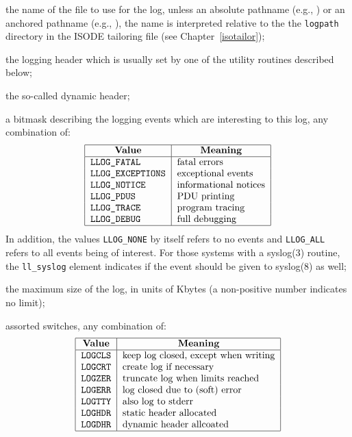 \begin{describe}
\item[\verb"ll\_file":] the name of the file to use for the log,
unless an absolute pathname (e.g., )
or an anchored pathname (e.g., ),
the name is interpreted relative to the the \verb"logpath" directory
in the ISODE tailoring file (see Chapter~\ref{isotailor});

\item[\verb"ll\_hdr":] the logging header which
is usually set by one of the utility routines described below;

\item[\verb"ll\_hdr"/\verb"ll\_dhdr":] the so-called dynamic header;

\item[\verb"ll\_events"/\verb"ll\_syslog":] a bitmask describing the logging
events which are interesting to this log, any combination of:
\[\begin{tabular}{|l|l|}
\hline
    \multicolumn{1}{|c|}{\bf Value}&
		\multicolumn{1}{c|}{\bf Meaning}\\
\hline
    \tt LLOG\_FATAL&		fatal errors\\
    \tt LLOG\_EXCEPTIONS&	exceptional events\\
    \tt LLOG\_NOTICE&		informational notices\\
    \tt LLOG\_PDUS&		PDU printing\\
    \tt LLOG\_TRACE&		program tracing\\
    \tt LLOG\_DEBUG&		full debugging\\
\hline
\end{tabular}\]
In addition, the values \verb"LLOG_NONE" by itself refers to no events
and \verb"LLOG_ALL" refers to all events being of interest.
For those systems with a \man syslog(3) routine,
the \verb"ll_syslog" element indicates if the event should be given to 
\man syslog(8) as well;

\item[\verb"ll\_msize":] the maximum size of the log, in units of Kbytes
(a non-positive number indicates no limit);

\item[\verb"ll\_stat":] assorted switches, any combination of:
\[\begin{tabular}{|l|l|}
\hline
    \multicolumn{1}{|c|}{\bf Value}&
	\multicolumn{1}{c|}{\bf Meaning}\\
\hline
    \tt LOGCLS&		keep log closed, except when writing\\
    \tt LOGCRT&		create log if necessary\\
    \tt LOGZER&		truncate log when limits reached\\
    \tt LOGERR&		log closed due to (soft) error\\
    \tt LOGTTY&		also log to stderr\\
    \tt LOGHDR&		static header allocated\\
    \tt LOGDHR&		dynamic header allcoated\\
\hline
\end{tabular}\]


\end{describe}
